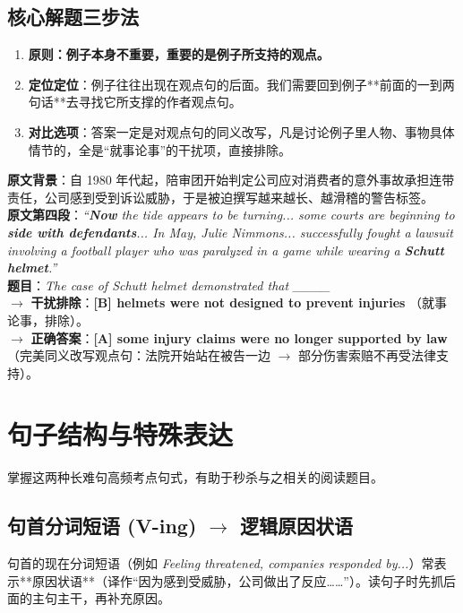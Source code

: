 \documentclass[cn,normal,11pt]{elegantnote}
\newcommand{\retrokey}[1]{{\color{accentcolor}\textbf{#1}}}
\begin{document}
\subsection{核心解题三步法}
\begin{enumerate}
  \item \textbf{原则：例子本身不重要，重要的是例子所支持的观点。}
  \item \textbf{定位定位}：例子往往出现在观点句的后面。我们需要回到例子**前面的一到两句话**去寻找它所支撑的作者观点句。
  \item \textbf{对比选项}：答案一定是对观点句的同义改写，凡是讨论例子里人物、事物具体情节的，全是“就事论事”的干扰项，直接排除。
\end{enumerate}

\begin{example}
  \textbf{原文背景}：自 1980 年代起，陪审团开始判定公司应对消费者的意外事故承担连带责任，公司感到受到诉讼威胁，于是被迫撰写越来越长、越滑稽的警告标签。\\
  \textbf{原文第四段}：\textit{“\retrokey{Now} the tide appears to be turning... some courts are beginning to \retrokey{side with defendants}... In May, Julie Nimmons... successfully fought a lawsuit involving a football player who was paralyzed in a game while wearing a \retrokey{Schutt helmet}.”}\\
  \textbf{题目}：\textit{The case of Schutt helmet demonstrated that \_\_\_\_}\\
  $\rightarrow$ \textbf{干扰排除}：\textbf{[B] helmets were not designed to prevent injuries} （就事论事，排除）。\\
  $\rightarrow$ \textbf{正确答案}：\textbf{[A] some injury claims were no longer supported by law} （完美同义改写观点句：法院开始站在被告一边 $\rightarrow$ 部分伤害索赔不再受法律支持）。
\end{example}

\section{句子结构与特殊表达}
掌握这两种长难句高频考点句式，有助于秒杀与之相关的阅读题目。

\subsection{句首分词短语 (V-ing) \ensuremath{\rightarrow} 逻辑原因状语}
句首的现在分词短语（例如 \textit{Feeling threatened, companies responded by...}）常表示**原因状语**（译作“因为感到受威胁，公司做出了反应……”）。读句子时先抓后面的主句主干，再补充原因。
\end{document}
